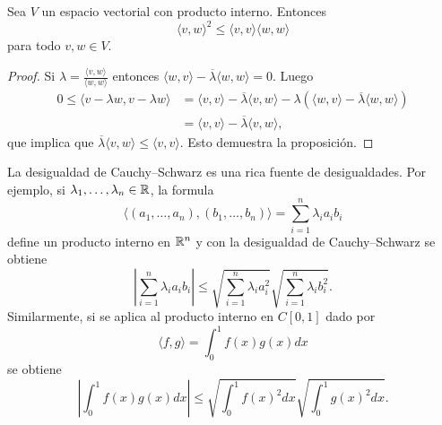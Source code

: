 \begin{prop}
    \label{pro:CauchySchwarz}
    Sea $V$ un espacio vectorial con producto interno. Entonces 
    \[
        \langle v,w\rangle^2\leq\langle v,v\rangle\langle w,w\rangle
    \]
    para todo $v,w\in V$.

    \begin{proof}
        Si $\lambda=\frac{\langle v,w\rangle}{\langle w,w\rangle}$ entonces
        $\langle w,v\rangle-\overline{\lambda}\langle w,w\rangle=0$. Luego
        \begin{align*}
            0\leq \langle v-\lambda w,v-\lambda w\rangle&=\langle v,v\rangle-\overline{\lambda}\langle v,w\rangle-\lambda(\langle w,v\rangle-\overline{\lambda}\langle w,w\rangle)\\
            &=\langle v,v\rangle-\overline{\lambda}\langle v,w\rangle,
        \end{align*}
        que implica que $\overline{\lambda}\langle v,w\rangle\leq\langle v,v\rangle$. Esto demuestra la proposición.
    \end{proof}
\end{prop}

\begin{examples}
	La desigualdad de Cauchy--Schwarz es una rica fuente de desigualdades. Por
	ejemplo, si $\lambda_1,\dots,\lambda_n\in\mathbb{R}$, la formula 
	\[
		\langle (a_1,\dots,a_n),(b_1,\dots,b_n)\rangle=\sum_{i=1}^n\lambda_ia_ib_i
	\]
	define un producto interno en $\mathbb{R}^n$ y con la desigualdad de
	Cauchy--Schwarz se obtiene 
	\[
	\left|\sum_{i=1}^n\lambda_ia_ib_i\right|\leq\sqrt{\sum_{i=1}^n\lambda_ia_i^2}\sqrt{\sum_{i=1}^n\lambda_ib_i^2}.
	\]
	Similarmente, si se aplica al producto interno en $C[0,1]$ dado por 
	\[
		\langle f,g\rangle=\int_0^1 f(x)g(x)dx
	\]
	se obtiene
	\[
		\left|\int_0^1f(x)g(x)dx\right|\leq\sqrt{\int_0^1f(x)^2dx}\sqrt{\int_0^1g(x)^2dx}.
	\]
\end{examples}

